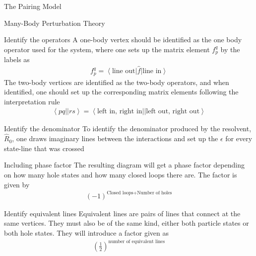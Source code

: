 \documentclass[twoside,english]{uiofysmaster}
\begin{document}
\begin{chapter}{The Pairing Model}
\begin{section}{Many-Body Perturbation Theory}
		\begin{subsection}{Identify the operators}
			A one-body vertex should be identified as the one body operator used for the system, where one sets up the matrix element $f_p^q$ by the labels as
			\begin{align}
				f_p^q = \left< \text{line out} \right| \hat f \left| \text{line in} \right>
			\end{align}
			The two-body vertices are identified as the two-body operators, and when identified, one should set up the corresponding matrix elements following the interpretation rule
			\begin{align}
				\left< pq || rs \right> = \left< \text{left in, right in} || \text{left out, right out} \right> 
			\end{align}
		\end{subsection}

		\begin{subsection}{Identify the denominator}
			To identify the denominator produced by the resolvent, $\hat R_0$, one draws imaginary lines between the interactions and set up the $\epsilon$ for every state-line that was crossed 
		\end{subsection}

		\begin{subsection}{Including phase factor}
			The resulting diagram will get a phase factor depending on how many hole states and how many closed loops there are. The factor is given by 
			\begin{align}
				(-1)^{\text{Closed loops} + \text{Number of holes}}
			\end{align}
		\end{subsection}

		\begin{subsection}{Identify equivalent lines}
			Equivalent lines are pairs of lines that connect at the same vertices. They must also be of the same kind, either both particle states or both hole states. They will introduce a factor given as 
			\begin{align}
				\left( \frac{1}{2} \right)^{\text{number of equivalent lines}}
			\end{align}
		\end{subsection}


\end{section}
\end{chapter}
\end{document}
